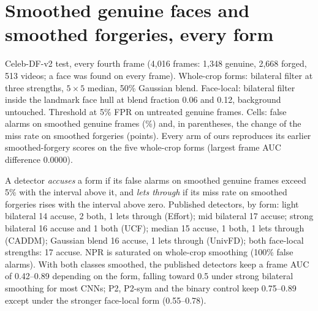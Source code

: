 \documentclass[10pt]{article}
\begin{document}
\section{Smoothed genuine faces and smoothed forgeries, every form}
\label{sec:smooth38}
\begin{table}[H]
\centering
\caption{Celeb-DF-v2 test, every fourth frame (4,016 frames: 1,348 genuine, 2,668 forged, 513 videos; a face was found on every
frame). Whole-crop forms: bilateral filter at three strengths, $5\times5$ median, 50\% Gaussian blend. Face-local: bilateral
filter inside the landmark face hull at blend fraction 0.06 and 0.12, background untouched. Threshold at 5\% FPR on untreated
genuine frames. Cells: false alarms on smoothed genuine frames (\%) and, in parentheses, the change of the miss rate on smoothed
forgeries (points). Every arm of ours reproduces its earlier smoothed-forgery scores on the five whole-crop forms (largest frame
AUC difference 0.0000).}
\label{tab:smooth38}
\scriptsize
\begin{adjustbox}{max width=\linewidth}\end{adjustbox}
\end{table}
A detector \emph{accuses} a form if its false alarms on smoothed genuine frames exceed 5\% with the interval above it, and \emph{lets
through} if its miss rate on smoothed forgeries rises with the interval above zero. Published detectors, by form: light bilateral
14 accuse, 2 both, 1 lets through (Effort); mid bilateral 17 accuse; strong bilateral 16 accuse and 1 both (UCF); median 15 accuse,
1 both, 1 lets through (CADDM); Gaussian blend 16 accuse, 1 lets through (UnivFD); both face-local strengths: 17 accuse. NPR is
saturated on whole-crop smoothing (100\% false alarms). With both classes smoothed, the published detectors keep a frame AUC of
0.42--0.89 depending on the form, falling toward 0.5 under strong bilateral smoothing for most CNNs; P2, P2-sym and the binary
control keep 0.75--0.89 except under the stronger face-local form (0.55--0.78).
\end{document}
